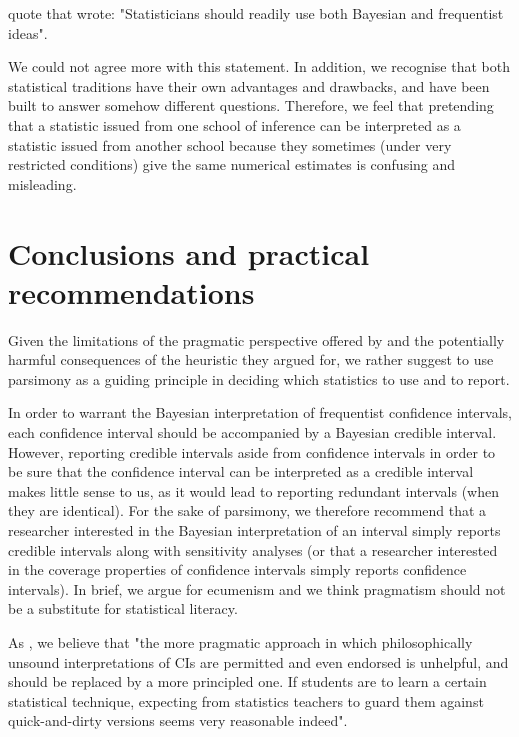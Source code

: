 \documentclass[a4paper,man,natbib,floatsintext,donotrepeattitle]{apa6}
\begin{document}
\cite{albers_credible_2018} quote \cite{bayarri_interplay_2004} that wrote: "Statisticians should readily use both Bayesian and frequentist ideas".

We could not agree more with this statement. In addition, we recognise that both statistical traditions have their own advantages and drawbacks, and have been built to answer somehow different questions. Therefore, we feel that pretending that a statistic issued from one school of inference can be interpreted as a statistic issued from another school because they sometimes (under very restricted conditions) give the same numerical estimates is confusing and misleading.

\section{Conclusions and practical recommendations}

Given the limitations of the pragmatic perspective offered by \cite{albers_credible_2018} and the potentially harmful consequences of the heuristic they argued for, we rather suggest to use parsimony as a guiding principle in deciding which statistics to use and to report.

In order to warrant the Bayesian interpretation of frequentist confidence intervals, each confidence interval should be accompanied by a Bayesian credible interval. However, reporting credible intervals aside from confidence intervals in order to be sure that the confidence interval can be interpreted as a credible interval makes little sense to us, as it would lead to reporting redundant intervals (when they are identical). For the sake of parsimony, we therefore recommend that a researcher interested in the Bayesian interpretation of an interval simply reports credible intervals along with sensitivity analyses (or that a researcher interested in the coverage properties of confidence intervals simply reports confidence intervals). In brief, we argue for ecumenism and we think pragmatism should not be a substitute for statistical literacy. 

As \cite{hoekstra_improving_2018}, we believe that "the more pragmatic approach in which philosophically unsound interpretations of CIs are permitted and even endorsed is unhelpful, and should be replaced by a more principled one. If students are to learn a certain statistical technique, expecting from statistics teachers to guard them against quick-and-dirty versions seems very reasonable indeed".
\end{document}
